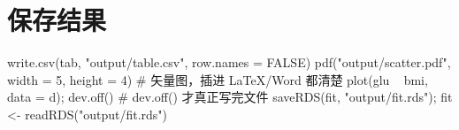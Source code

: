 \section{保存结果}
\begin{rcode}[R · 存表、存图、存模型]
write.csv(tab, "output/table.csv", row.names = FALSE)
pdf("output/scatter.pdf", width = 5, height = 4)    # 矢量图，插进 LaTeX/Word 都清楚
plot(glu ~ bmi, data = d); dev.off()                 # dev.off() 才真正写完文件
saveRDS(fit, "output/fit.rds"); fit <- readRDS("output/fit.rds")
\end{rcode}
